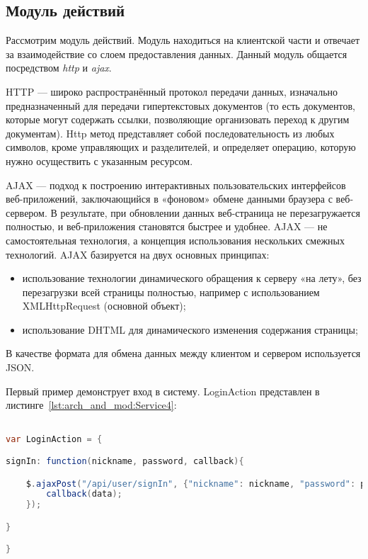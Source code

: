 \subsection{Модуль действий}
Рассмотрим модуль действий. Модуль находиться на клиентской части и отвечает за взаимодействие со слоем предоставления данных. Данный модуль общается посредством \textit{http} и \textit{ajax}. 

HTTP — широко распространённый протокол передачи данных, изначально предназначенный для передачи гипертекстовых документов (то есть документов, которые могут содержать ссылки, позволяющие организовать переход к другим документам). Http метод представляет собой последовательность из любых символов, кроме управляющих и разделителей, и определяет операцию, которую нужно осуществить с указанным ресурсом. 

AJAX --- подход к построению интерактивных пользовательских интерфейсов веб-приложений, заключающийся в «фоновом» обмене данными браузера с веб-сервером. В результате, при обновлении данных веб-страница не перезагружается полностью, и веб-приложения становятся быстрее и удобнее. AJAX — не самостоятельная технология, а концепция использования нескольких смежных технологий. 
AJAX базируется на двух основных принципах:

\begin{itemize}
	\item использование технологии динамического обращения к серверу «на лету», без перезагрузки всей страницы полностью, например с использованием XMLHttpRequest (основной объект);
	\item использование DHTML для динамического изменения содержания страницы;
\end{itemize}

В качестве формата для обмена данных между клиентом и сервером используется JSON.

Первый пример демонструет вход в систему. LoginAction представлен в листинге~\ref{lst:arch_and_mod:Service4}:

\begin{lstlisting}[language=Java, style=rubystyle, caption={Определение LoginAction}, label=lst:arch_and_mod:Service4]

var LoginAction = {

signIn: function(nickname, password, callback){

	$.ajaxPost("/api/user/signIn", {"nickname": nickname, "password": password}, function (data) {
		callback(data);
	});

}

}
\end{lstlisting}

